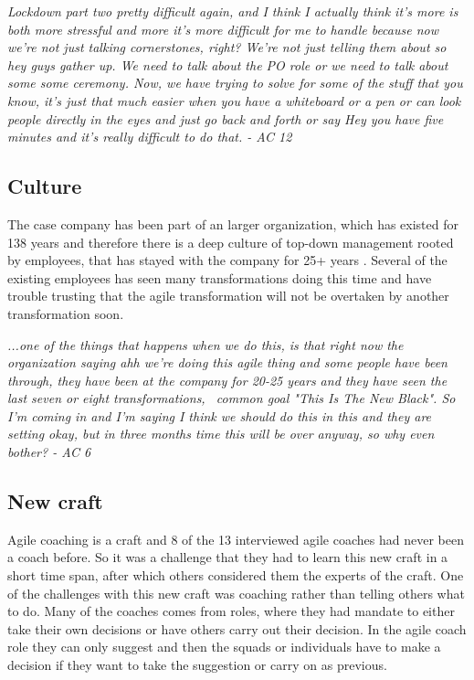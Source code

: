 \documentclass[11pt,a4paper]{report}
\begin{document}
\begin{displayquote}
\textit{
Lockdown part two pretty difficult again, and I think I actually think it's more is both more stressful and more it's more difficult for me to handle because now we're not just talking cornerstones, right? We're not just telling them about so hey guys gather up. We need to talk about the PO role or we need to talk about some some ceremony. Now, we have trying to solve for some of the stuff that you know, it's just that much easier when you have a whiteboard or a pen or can look people directly in the eyes and just go back and forth or say Hey you have five minutes and it's really difficult to do that. - AC 12
}
\end{displayquote}

\subsection{Culture}
The case company has been part of an larger organization, which has existed for 138 years and therefore there is a deep culture of top-down management rooted by employees, that has stayed with the company for 25+ years \cite{tdcHistory}. Several of the existing employees has seen many transformations doing this time and have trouble trusting that the agile transformation will not be overtaken by another transformation soon. 

\begin{displayquote}
\textit{
...one of the things that happens when we do this, is that right now the organization saying ahh we're doing this agile thing and some people have been through, they have been at the company for 20-25 years and they have seen the last seven or eight transformations,  common goal "This Is The New Black". So I'm coming in and I'm saying I think we should do this in this and they are setting okay, but in three months time this will be over anyway, so why even bother? - AC 6
}
\end{displayquote}


\subsection{New craft}
Agile coaching is a craft and 8 of the 13 interviewed agile coaches had never been a coach before. So it was a challenge that they had to learn this new craft in a short time span, after which others considered them the experts of the craft. One of the challenges with this new craft was coaching rather than telling others what to do. Many of the coaches comes from roles, where they had mandate to either take their own decisions or have others carry out their decision. In the agile coach role they can only suggest and then the squads or individuals have to make a decision if they want to take the suggestion or carry on as previous.
\end{document}
